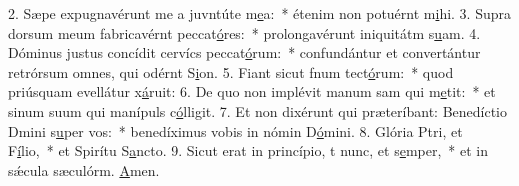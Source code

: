 2. Sæpe expugnavérunt me a juvntúte m\uline{e}a:~* étenim non potuérnt m\uline{i}hi.
3. Supra dorsum meum fabricavérnt peccat\uline{ó}res:~* prolongavérunt iniquitátm s\uline{u}am.
4. Dóminus justus concídit cervícs peccat\uline{ó}rum:~* confundántur et convertántur retrórsum omnes, qui odérnt S\uline{i}on.
5. Fiant sicut fnum tect\uline{ó}rum:~* quod priúsquam evellátur x\uline{á}ruit:
6. De quo non implévit manum sam qui m\uline{e}tit:~* et sinum suum qui manípuls c\uline{ó}lligit.
7. Et non dixérunt qui præteríbant: Benedíctio Dmini s\uline{u}per vos:~* benedíximus vobis in nómin D\uline{ó}mini.
8. Glória Ptri, et F\uline{í}lio,~* et Spirítu S\uline{a}ncto.
9. Sicut erat in princípio, t nunc, et s\uline{e}mper,~* et in sǽcula sæculórm. \uline{A}men.
